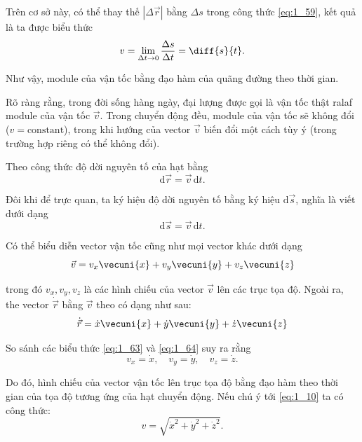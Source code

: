 \noindent
Trên cơ sở này, có thể thay thế $|\Delta\vec{r}|$ bằng $\Delta s$ trong công thức \eqref{eq:1_59}, kết quả là ta được biểu thức
\begin{equation}\label{eq:1_60}
v = \lim_{\Delta t\to 0} \frac{\Delta s}{\Delta t} = \diff{s}{t}.
\end{equation}

\noindent
Như vậy, module của vận tốc bằng đạo hàm của quãng đường theo thời gian.

Rõ ràng rằng, trong đời sống hàng ngày, đại lượng được gọi là vận tốc thật ralaf module của vận tốc $\vec{v}$. Trong chuyển động đều, module của vận tốc sẽ không đổi ($v=\text{constant}$), trong khi hướng của vector $\vec{v}$ biến đổi một cách tùy ý (trong trường hợp riêng có thể không đổi).

Theo công thức  độ dời nguyên tố của hạt bằng
\begin{equation}\label{eq:1_61}
\mathrm{d}\vec{r} = \vec{v}\,\mathrm{d}{t}.
\end{equation}

\noindent
Đôi khi để trực quan, ta ký hiệu độ dời nguyên tố bằng ký hiệu $\mathrm{d}\vec{s}$, nghĩa là viết  dưới dạng
\begin{equation}\label{eq:1_62}
\mathrm{d}\vec{s} = \vec{v}\,\mathrm{d}{t}.
\end{equation}

Có thể biểu diễn vector vận tốc cũng như mọi vector khác dưới dạng
\begin{equation}\label{eq:1_63}
\vec{v} = v_x\vecuni{x} + v_y\vecuni{y} + v_z\vecuni{z}
\end{equation}

\noindent
trong đó $v_x, v_y, v_z$ là các hình chiếu của vector $\vec{v}$ lên các trục tọa độ. Ngoài ra, the vector $\dot{\vec{r}}$ bằng $\vec{v}$ theo  có dạng như sau:
\begin{equation}\label{eq:1_64}
\dot{\vec{r}} = \dot{x}\vecuni{x} + \dot{y}\vecuni{y} + \dot{z}\vecuni{z}
\end{equation}

\noindent
So sánh các biểu thức \eqref{eq:1_63} và \eqref{eq:1_64} suy ra rằng
\begin{equation}\label{eq:1_65}
v_x = \dot{x},\quad v_y = \dot{y},\quad v_z = \dot{z}.
\end{equation}

\noindent
Do đó, hình chiếu của vector vận tốc lên trục tọa độ bằng đạo hàm theo thời gian của tọa độ tương ứng của hạt chuyển động. Nếu chú ý tới \eqref{eq:1_10} ta có công thức:
\begin{equation}\label{eq:1_66}
v = \sqrt{\dot{x}^2 + \dot{y}^2 + \dot{z}^2}.
\end{equation}


